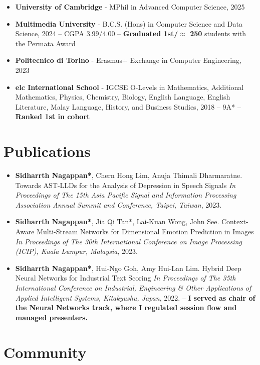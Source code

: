 \documentclass{article}
\begin{document}
\begin{itemize}
    \item \textbf{University of Cambridge} - MPhil in Advanced Computer Science, 2025
    \item \textbf{Multimedia University} - B.C.S. (Hons) in Computer Science and Data Science, 2024 -- CGPA 3.99/4.00 -- \textbf{Graduated 1st/$\approx$ 250} students with the Permata Award
    \item \textbf{Politecnico di Torino} - Erasmus+ Exchange in Computer Engineering, 2023
    \item \textbf{elc International School} - IGCSE O-Levels in Mathematics, Additional Mathematics, Physics, Chemistry, Biology, English Language, English Literature, Malay Language, History, and Business Studies, 2018 -- 9A* -- \textbf{Ranked 1st in cohort}
\end{itemize}

\section{Publications}

\begin{itemize}
    \item \textbf{Sidharrth Nagappan*}, Chern Hong Lim, Anuja Thimali Dharmaratne. Towards AST-LLDs for the Analysis of Depression in Speech Signals \textit{In Proceedings of The 15th Asia Pacific Signal and Information Processing Association Annual Summit and Conference, Taipei, Taiwan}, 2023.
    \item \textbf{Sidharrth Nagappan*}, Jia Qi Tan*, Lai-Kuan Wong, John See. Context-Aware Multi-Stream Networks for Dimensional Emotion Prediction in Images \textit{In Proceedings of The 30th International Conference on Image Processing (ICIP), Kuala Lumpur, Malaysia}, 2023.
    \item \textbf{Sidharrth Nagappan*}, Hui-Ngo Goh, Amy Hui-Lan Lim. Hybrid Deep Neural Networks for Industrial Text Scoring \textit{In Proceedings of The 35th International Conference on Industrial, Engineering \& Other Applications of Applied Intelligent Systems, Kitakyushu, Japan}, 2022. -- \textbf{I served as chair of the Neural Networks track, where I regulated session flow and managed presenters.}
\end{itemize}

\section{Community}
\end{document}
